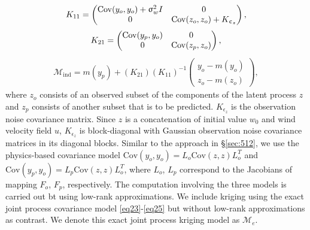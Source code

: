 \documentclass[article,ij4uq]{ij4uq}              %
\begin{document}
\begin{align}
    K_{11}=\begin{pmatrix}\mathrm{Cov}(y_{o},y_{o})+\sigma_{w}^{2}I & 0\\0 & {\rm{Cov}}(z_{o},z_{o})+K_{\epsilon_{z}}\end{pmatrix},\label{eq69}
\end{align}
\begin{align}
    K_{21}=\begin{pmatrix}\mathrm{Cov}(y_{p},y_{o}) & 0\\0 & {\rm{Cov}}(z_{p},z_{o})\end{pmatrix},\label{eq70}
\end{align}
\begin{align}
    \mathcal{M}_{\mathrm{ind}}=m(y_{p})+(K_{21})(K_{11})^{-1}\begin{pmatrix}y_{o}-m(y_{o})\\z_{o}-m(z_{o})\end{pmatrix},\label{eq71}
\end{align}
where $z_{o}$ consists of an observed subset of the components of the latent process $z$ and $z_{p}$ consists of another subset that is to be predicted. $K_{\epsilon_{z}}$ is the observation noise covariance matrix. Since $z$ is a concatenation of initial value $w_{0}$ and wind velocity field $u$, $K_{\epsilon_{z}}$ is block-diagonal with Gaussian observation noise covariance matrices in its diagonal blocks. Similar to the approach in  \S \ref{sec:512}, we use the physics-based covariance model $\mathrm{Cov}(y_{o},y_{o})=L_{o}\mathrm{Cov}(z,z)L_{o}^{T}$ and $\mathrm{Cov}(y_{p},y_{o})=L_{p}\mathrm{Cov}(z,z)L_{o}^{T}$, where $L_{o}$, $L_{p}$ correspond to the Jacobians of mapping $F_{o}$, $F_{p}$, respectively. The computation involving the three models is carried out bt using  low-rank approximations. We include kriging using the exact joint process covariance model \eqref{eq23}-\eqref{eq25} but without low-rank approximations as contrast. We denote this exact joint process kriging model as $\mathcal{M}_{e}$.
\end{document}
